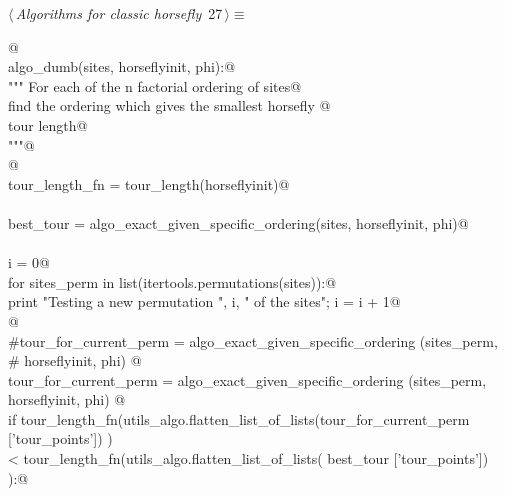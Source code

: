 \documentclass[11.5pt]{report}
\begin{document}
\begin{flushleft} \small
\begin{minipage}{\linewidth}\label{scrap22}\raggedright\small
{} $\langle\,${\itshape Algorithms for classic horsefly}\nobreak\ {\footnotesize {27}}$\,\rangle\equiv$
\vspace{-1ex}
\begin{list}{}{} \item
\mbox{}\verb@   @\\
\mbox{}\verb@def algo_dumb(sites, horseflyinit, phi):@\\
\mbox{}\verb@    """ For each of the n factorial ordering of sites@\\
\mbox{}\verb@    find the ordering which gives the smallest horsefly @\\
\mbox{}\verb@    tour length@\\
\mbox{}\verb@    """@\\
\mbox{}\verb@    @\\
\mbox{}\verb@    tour_length_fn = tour_length(horseflyinit)@\\
\mbox{}\verb@@\\
\mbox{}\verb@    best_tour = algo_exact_given_specific_ordering(sites, horseflyinit, phi)@\\
\mbox{}\verb@@\\
\mbox{}\verb@    i = 0@\\
\mbox{}\verb@    for sites_perm in list(itertools.permutations(sites)):@\\
\mbox{}\verb@        print "Testing a new permutation ", i, " of the sites"; i = i + 1@\\
\mbox{}\verb@          @\\
\mbox{}\verb@        #tour_for_current_perm = algo_exact_given_specific_ordering (sites_perm, \@\\
\mbox{}\verb@        #                                                             horseflyinit, phi) @\\
\mbox{}\verb@        tour_for_current_perm = algo_exact_given_specific_ordering (sites_perm, \@\\
\mbox{}\verb@                                                                    horseflyinit, phi) @\\
\mbox{}\verb@        if tour_length_fn(utils_algo.flatten_list_of_lists(tour_for_current_perm ['tour_points']) ) \@\\
\mbox{}\verb@         < tour_length_fn(utils_algo.flatten_list_of_lists(            best_tour ['tour_points']) ):@\\

\end{list}
\end{minipage}
\end{flushleft}
\end{document}
